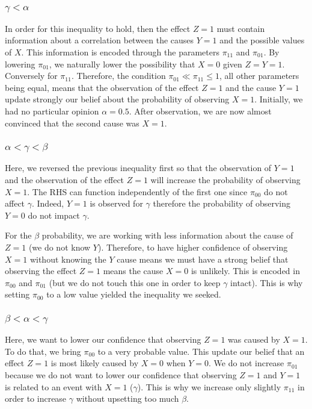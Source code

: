 \documentclass{article}
\numberwithin{equation}{section}
\theoremstyle{named}
\begin{document}
\subsection{}

\subsubsection{$\gamma < \alpha$}
In order for this inequality to hold, then the effect $Z = 1$ must contain information 
about a correlation between the causes $Y = 1$ and the possible values of $X$.
This information is encoded 
through the parameters $\pi_{11}$ and $\pi_{01}$. By lowering $\pi_{01}$, we 
naturally lower the possibility that $X = 0$ given $Z = Y = 1$. Conversely 
for $\pi_{11}$. Therefore, the condition $\pi_{01} \ll \pi_{11} \leq 1$, 
all other parameters being equal, means that the observation of the effect $Z = 1$ 
and the cause $Y = 1$ update strongly our belief about the probability of observing $X = 1$. 
Initially, we had no particular opinion $\alpha = 0.5$. After observation, we are now 
almost convinced that the second cause was $X = 1$.


\subsubsection{$\alpha < \gamma < \beta$}
Here, we reversed the previous inequality first so that the observation of $Y = 1$ 
and the observation of the effect $Z = 1$ will increase the probability of observing 
$X = 1$. The RHS can function independently of the first one since $\pi_{00}$ 
do not affect $\gamma$. Indeed, $Y = 1$ is observed for $\gamma$ therefore
the probability 
of observing $Y = 0$ do not impact $\gamma$. \par
For the $\beta$ probability, we are working with less information about the cause 
of $Z = 1$ (we do not know $Y$). Therefore, to have higher confidence of observing 
$X = 1$ without knowing the $Y$ cause means we must have a strong belief that 
observing the effect $Z = 1$ means the cause $X = 0$ is unlikely. 
This is encoded in $\pi_{00}$
and $\pi_{01}$ (but we do not touch this one in order to keep $\gamma$ intact).
This is why setting $\pi_{00}$ to a low value yielded the inequality we seeked.

\subsubsection{$\beta < \alpha < \gamma$}
Here, we want to lower our confidence that observing $Z = 1$ was caused by 
$X = 1$. To do that, we bring $\pi_{00}$ to a very probable value. This 
update our belief that an effect $Z = 1$ is most likely caused by $X = 0$ when 
$Y = 0$. We do not increase $\pi_{01}$ because we do not want to lower our 
confidence that observing $Z = 1$ and $Y = 1$ is related to an event with 
$X = 1$ ($\gamma$). This is why we increase only slightly $\pi_{11}$ in order to 
increase $\gamma$ without upsetting too much $\beta$. 
\end{document}
